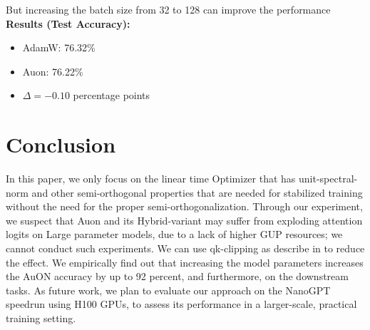\documentclass[12pt,a4paper]{article}
\begin{document}
But increasing the batch size from 32 to 128 can improve the performance
\noindent \textbf{Results (Test Accuracy):}
\begin{itemize}
    \item AdamW: 76.32\%
    \item Auon: 76.22\%
    \item $\Delta = -0.10$ percentage points
\end{itemize}


\section{Conclusion}
In this paper, we only focus on the linear time  Optimizer that has  unit-spectral-norm and other semi-orthogonal  properties that are needed for stabilized training  without the need for the proper semi-orthogonalization. Through our experiment, we suspect   that Auon and its Hybrid-variant may suffer from exploding attention logits\parencite{kimiteam2025kimik2openagentic} on Large parameter models, due to a lack of higher GUP resources; we cannot conduct such experiments. We can use qk-clipping as describe in \parencite{kimiteam2025kimik2openagentic} to reduce the effect. We empirically find out that increasing the model parameters   increases the AuON accuracy by up to 92 percent, and furthermore, on the downstream tasks. As future work, we plan to evaluate our approach on the NanoGPT speedrun using H100 GPUs, to assess its performance in a larger-scale, practical training setting.
\printbibliography
\end{document}
